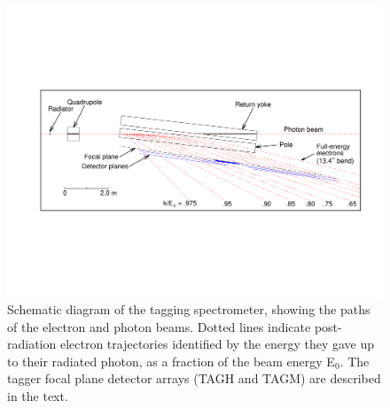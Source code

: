 \begin{figure}[tbp]
\begin{center}
   \includegraphics[width=0.95\linewidth,viewport=80 200 750 400]{figures/BEAM_taggerplot.pdf}
\caption{Schematic diagram of the tagging spectrometer, showing the paths of the electron
and photon beams. Dotted lines indicate post-radiation electron trajectories identified by
the energy they gave up to their radiated photon, as a fraction of the beam energy E$_0$.
The tagger focal plane detector arrays (TAGH and TAGM) are described in the text.
       \label{fig:beam:BEAM_taggerplot}  }
\end{center}
\end{figure}

